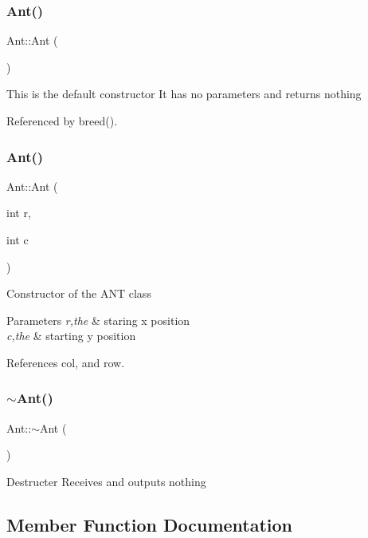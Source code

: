 \subsubsection{Ant()\hspace{0.1cm}{\footnotesize\ttfamily [1/2]}}
{\footnotesize\ttfamily Ant\+::\+Ant (\begin{DoxyParamCaption}{ }\end{DoxyParamCaption})}

This is the default constructor It has no parameters and returns nothing 

Referenced by breed().

\mbox{\label{classAnt_aa92b218513230e9cbf060f70dd3f724a}} 
\subsubsection{Ant()\hspace{0.1cm}{\footnotesize\ttfamily [2/2]}}
{\footnotesize\ttfamily Ant\+::\+Ant (\begin{DoxyParamCaption}\item[{int}]{r,  }\item[{int}]{c }\end{DoxyParamCaption})}

Constructor of the A\+NT class 
\begin{DoxyParams}{Parameters}
{\em r,the} & staring x position \\
\hline
{\em c,the} & starting y position \\
\hline
\end{DoxyParams}


References col, and row.

\mbox{\label{classAnt_a33ca6bd592236726a18a2159908e4116}} 
\subsubsection{$\sim$\+Ant()}
{\footnotesize\ttfamily Ant\+::$\sim$\+Ant (\begin{DoxyParamCaption}{ }\end{DoxyParamCaption})}

Destructer Receives and outputs nothing 

\subsection{Member Function Documentation}
\mbox{\label{classAnt_af899faded61186f5ca27e43cee1463ba}} 
